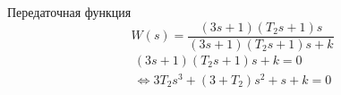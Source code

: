 \documentclass[a4paper, 11pt] {article}
\begin{document}
    Передаточная функция  \[W(s) = \frac{{(3s + 1)({T_2}s + 1)s}}{{(3s + 1)({T_2}s + 1)s + k}}\]
\[\begin{array}{l}
(3s + 1)({T_2}s + 1)s + k = 0\\
\Leftrightarrow 3{T_2}{s^3} + (3 + {T_2}){s^2} + s + k = 0
\end{array}\]
\end{document}
